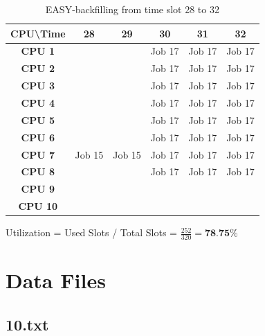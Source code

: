 \documentclass[11pt]{article}
\begin{document}
\begin{table}
\centering
\begin{tabular}{|c|c|c|c|c|c|}
\hline
\textbf{CPU\textbackslash{}Time} & \textbf{28} & \textbf{29} & \textbf{30} & \textbf{31} & \textbf{32} \\ \hline
\textbf{CPU 1}                   &             &             & Job 17      & Job 17      & Job 17      \\ \hline
\textbf{CPU 2}                   &             &             & Job 17      & Job 17      & Job 17      \\ \hline
\textbf{CPU 3}                   &             &             & Job 17      & Job 17      & Job 17      \\ \hline
\textbf{CPU 4}                   &             &             & Job 17      & Job 17      & Job 17      \\ \hline
\textbf{CPU 5}                   &             &             & Job 17      & Job 17      & Job 17      \\ \hline
\textbf{CPU 6}                   &             &             & Job 17      & Job 17      & Job 17      \\ \hline
\textbf{CPU 7}                   & Job 15      & Job 15      & Job 17      & Job 17      & Job 17      \\ \hline
\textbf{CPU 8}                   &             &             & Job 17      & Job 17      & Job 17      \\ \hline
\textbf{CPU 9}                   &             &             &             &             &             \\ \hline
\textbf{CPU 10}                  &             &             &             &             &             \\ \hline
\end{tabular}
\caption{\label{EASY28}EASY-backfilling from time slot 28 to 32}
\end{table}

\begin{center}
Utilization = Used Slots / Total Slots = $\frac{252}{320} = \textbf{78.75\%}$
\end{center}

\newpage

\appendix

\section{Data Files}
\subsection{10.txt}

\end{document}
